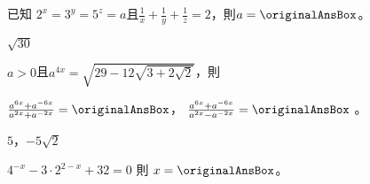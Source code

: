 \begin{QUESTIONS}
\begin{QUESTION}
    \begin{QSOL}
    \end{QSOL}
    \begin{QEMPTYSPACE}
    \end{QEMPTYSPACE}
\end{QUESTION}
\begin{QUESTION}
    \begin{QBODY}
        已知 ${{2}^{x}}={{3}^{y}}={{5}^{z}}=a$且$\frac{1}{x}+\frac{1}{y}+\frac{1}{z}=2$，則$a=\originalAnsBox $。
    \end{QBODY}
    \begin{QFROMS}
    \end{QFROMS}
    \begin{QTAGS} \end{QTAGS}
    \begin{QANS}
        $\sqrt{30}$
    \end{QANS}
    \begin{QSOL}
    \end{QSOL}
    \begin{QEMPTYSPACE}
    \end{QEMPTYSPACE}
\end{QUESTION}
\begin{QUESTION}
    \begin{QBODY}
         $a>0$且${{a}^{4x}}=\sqrt{29-12\sqrt{3+2\sqrt{2}}}$，則
         \begin{SUBQLIST}
             \SUBQ $\frac{{{a}^{6x}}+{{a}^{-6x}}}{{{a}^{2x}}+{{a}^{-2x}}}=\originalAnsBox$，
             \SUBQ $\frac{{{a}^{6x}}+{{a}^{-6x}}}{{{a}^{2x}}-{{a}^{-2x}}}=\originalAnsBox $                 。
         \end{SUBQLIST}
    \end{QBODY}
    \begin{QFROMS}
    \end{QFROMS}
    \begin{QTAGS} \end{QTAGS}
    \begin{QANS}
        $5$，$-5\sqrt{2}$
    \end{QANS}
    \begin{QSOL}
    \end{QSOL}
    \begin{QEMPTYSPACE}
    \end{QEMPTYSPACE}
\end{QUESTION}
\begin{QUESTION}
    \begin{QBODY}
        ${{4}^{-x}}-3\cdot {{2}^{2-x}}+32=0$ 則 $x=\originalAnsBox $。

\end{QBODY}
\end{QUESTION}
\end{QUESTIONS}
